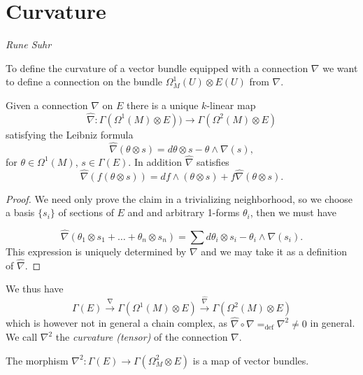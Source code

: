 \documentclass[a4paper,openany]{scrbook}
\newcommand{\chapterauthor}[1]{\hfill\emph{#1}\par\noindent}
\begin{document}
\section{Curvature}
\chapterauthor{Rune Suhr}

To define the curvature of a vector bundle equipped with a connection $\nabla$ we want to define a connection on the bundle $\Omega^1_M(U) \otimes E(U)$ from $\nabla$.

\begin{lemma} \label{connection1-2}
Given a connection $\nabla$ on $E$ there is a unique $k$-linear map 
\[
\hat{\nabla}: \Gamma (\Omega^1 (M)\otimes E)) \to \Gamma (\Omega^2(M)\otimes E)
\]
satisfying the Leibniz formula
\[
\hat{\nabla}(\theta \otimes s)= d \theta \otimes s - \theta \wedge \nabla (s),
\]
for $\theta \in \Omega^1(M)$, $s \in \Gamma(E)$. In addition $\hat{\nabla}$ satisfies 
\[
\hat{\nabla}(f(\theta \otimes s))= d f \wedge (\theta \otimes s) + f\hat{\nabla}(\theta \otimes s).
\]
\end{lemma}

\begin{proof}
We need only prove the claim in a trivializing neighborhood, so we choose a basis $\{s_i\}$ of sections of $E$ and and arbitrary 1-forms $\theta_i$, then we must have

\[
\hat{\nabla}(\theta_1 \otimes s_1 + \dots + \theta_n \otimes s_n)=\sum  d \theta_i \otimes s_i - \theta_i \wedge \nabla (s_i).
\]
This expression is uniquely determined by $\nabla$ and we may take it as a definition of $\hat{\nabla}$.
\end{proof}

We thus have 
\[
\Gamma(E) \xrightarrow{\nabla} \Gamma(\Omega^1(M)\otimes E) \xrightarrow{\hat{\nabla}} \Gamma (\Omega^2(M)\otimes E)
\] which is however not in general a chain complex, as $\hat{\nabla} \circ \nabla =_{\text{def}} \nabla^2 \neq 0$ in general. We call $\nabla^2$ the \emph{curvature (tensor)} of the connection $\nabla$.


%
%
%
\begin{lemma} \label{curvature-vb}
The morphism $\nabla^2\colon \Gamma(E) \to \Gamma(\Omega^2_M \otimes E)$ is a map of vector bundles.
\end{lemma}
\end{document}
